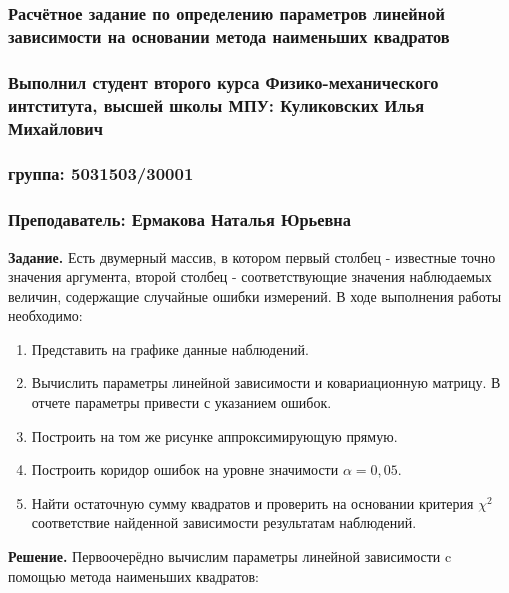 \documentclass[a4paper, 12pt]{article}
\begin{document}
	\begin{center}
		\subsubsection*{Расчётное задание по определению параметров линейной зависимости на основании метода наименьших квадратов }
		\subsubsection*{Выполнил студент второго курса Физико-механического интститута, высшей школы МПУ: Куликовских Илья Михайлович}
		\subsubsection*{группа: 5031503/30001}
		\subsubsection*{Преподаватель: Ермакова Наталья Юрьевна}
	\end{center}
	
	\quad \textbf{Задание. } Есть двумерный массив, в котором первый столбец - известные точно значения аргумента, второй столбец - соответствующие значения наблюдаемых величин, содержащие случайные ошибки измерений.  В ходе выполнения работы необходимо:
	\begin{enumerate}
		\item  Представить на графике данные наблюдений.
		\item  Вычислить параметры линейной зависимости и ковариационную матрицу. В отчете
		параметры привести с указанием ошибок.
		\item  Построить на том же рисунке аппроксимирующую прямую.
		\item  Построить коридор ошибок на уровне значимости $\alpha = 0,05$.
		\item  Найти остаточную сумму квадратов и проверить на основании критерия $\chi^2$ соответствие
		найденной зависимости результатам наблюдений.
	\end{enumerate}
	
	\quad \textbf{Решение. } Первоочерёдно вычислим параметры линейной зависимости c помощью метода наименьших квадратов:
	
\end{document}
